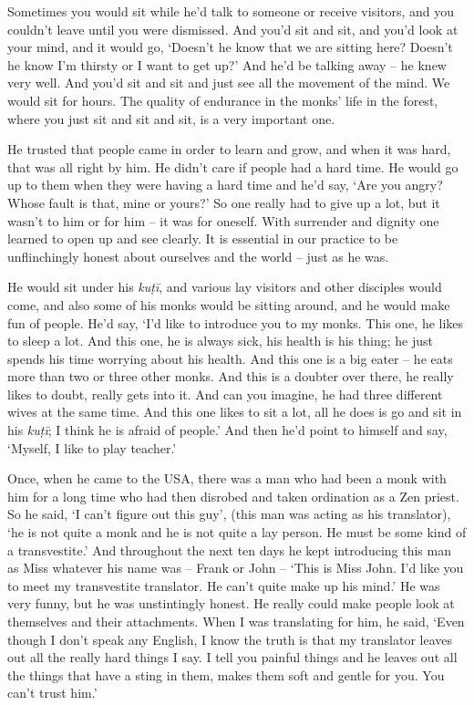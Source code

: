 Sometimes you would sit while he'd talk to someone or receive visitors, 
and you couldn't leave until you were dismissed. And you'd sit and sit, 
and you'd look at your mind, and it would go, `Doesn't he know that we
are sitting here? Doesn't he know I'm thirsty or I want to get up?' And
he'd be talking away -- he knew very well. And you'd sit and sit and
just see all the movement of the mind. We would sit for hours. The
quality of endurance in the monks' life in the forest, where you just
sit and sit and sit, is a very important one. 

He trusted that people came in order to learn and grow, and when it was
hard, that was all right by him. He didn't care if people had a hard
time. He would go up to them when they were having a hard time and he'd
say, `Are you angry? Whose fault is that, mine or yours?' So one really
had to give up a lot, but it wasn't to him or for him -- it was for
oneself. With surrender and dignity one learned to open up and see
clearly. It is essential in our practice to be unflinchingly honest
about ourselves and the world -- just as he was. 

He would sit under his \emph{kuṭī}, and various lay visitors and other
disciples would come, and also some of his monks would be sitting
around, and he would make fun of people. He'd say, `I'd like to
introduce you to my monks. This one, he likes to sleep a lot. And this
one, he is always sick, his health is his thing; he just spends his time
worrying about his health. And this one is a big eater -- he eats more
than two or three other monks. And this is a doubter over there, he
really likes to doubt, really gets into it. And can you imagine, he had
three different wives at the same time. And this one likes to sit a lot, 
all he does is go and sit in his \emph{kuṭī}; I think he is afraid of
people.' And then he'd point to himself and say, `Myself, I like to play
teacher.'

Once, when he came to the USA, there was a man who had been a monk with
him for a long time who had then disrobed and taken ordination as a Zen
priest. So he said, `I can't figure out this guy', (this man was acting
as his translator), `he is not quite a monk and he is not quite a lay
person. He must be some kind of a transvestite.' And throughout the next
ten days he kept introducing this man as Miss whatever his name was --
Frank or John -- `This is Miss John. I'd like you to meet my
transvestite translator. He can't quite make up his mind.' He was very
funny, but he was unstintingly honest. He really could make people look
at themselves and their attachments. When I was translating for him, he
said, `Even though I don't speak any English, I know the truth is that
my translator leaves out all the really hard things I say. I tell you
painful things and he leaves out all the things that have a sting in
them, makes them soft and gentle for you. You can't trust him.'

